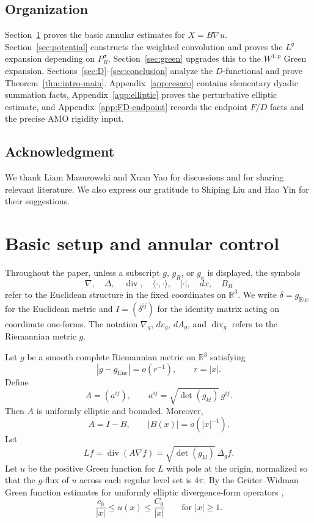 \documentclass[11pt]{amsart}
\numberwithin{equation}{section}
\theoremstyle{definition}
\newcommand{\R}{\mathbb R}
\newcommand{\Euc}{\mathrm{Euc}}
\newcommand{\divE}{\operatorname{div}}
\newcommand{\ip}[2]{\langle #1,#2\rangle}
\newcommand{\abs}[1]{\left\lvert #1\right\rvert}
\begin{document}
\subsection{Organization}
Section~\ref{sec:setup} proves the basic annular estimates for $X=B\nabla u$.  Section~\ref{sec:potential} constructs the weighted convolution and proves the $L^q$ expansion depending on $P_R^\sigma$.  Section~\ref{sec:green} upgrades this to the $W^{1,p}$ Green expansion.  Sections~\ref{sec:D}--\ref{sec:conclusion} analyze the $D$-functional and prove Theorem~\ref{thm:intro-main}.  Appendix~\ref{app:cesaro} contains elementary dyadic summation facts, Appendix~\ref{app:elliptic} proves the perturbative elliptic estimate, and Appendix~\ref{app:FD-endpoint} records the endpoint $F/D$ facts and the precise AMO rigidity input.

\subsection*{Acknowledgment} We thank Liam Mazurowski and Xuan Yao for discussions and for sharing relevant literature. We also express our gratitude to Shiping Liu and Hao Yin for their suggestions.

\section{Basic setup and annular control}
\label{sec:setup}

Throughout the paper, unless a subscript $g$, $g_R$, or $g_a$ is displayed, the symbols
$$
        \nabla,\quad \Delta,\quad \divE,\quad \ip{\cdot}{\cdot},\quad |\cdot|,
        \quad dx,\quad B_R
$$
refer to the Euclidean structure in the fixed coordinates on $\R^3$.  We write $\delta=g_{\Euc}$ for the Euclidean metric and $I=(\delta^{ij})$ for the identity matrix acting on coordinate one-forms.  The notation $\nabla_g$, $dv_g$, $dA_g$, and $\operatorname{div}_g$ refers to the Riemannian metric $g$.

Let $g$ be a smooth complete Riemannian metric on $\R^3$ satisfying
\begin{equation}\label{eq:c0-decay}
        \abs{g-g_{\Euc}}=o(r^{-1}),\qquad r=\abs{x}.
\end{equation}
Define
$$
        A=(a^{ij}),\qquad a^{ij}=\sqrt{\det(g_{kl})}\,g^{ij}.
$$
Then $A$ is uniformly elliptic and bounded.  Moreover,
\begin{equation}\label{eq:A-I-B}
        A=I-B,
        \qquad \abs{B(x)}=o(\abs{x}^{-1}).
\end{equation}
Let
$$
        Lf=\divE(A\nabla f)=\sqrt{\det(g_{kl})}\,\Delta_g f.
$$
Let $u$ be the positive Green function for $L$ with pole at the origin, normalized so that the $g$-flux of $u$ across each regular level set is $4\pi$.  By the Gr\"uter--Widman Green function estimates for uniformly elliptic divergence-form operators \cite[Theorem~1.1]{GW},
\begin{equation}\label{eq:green-two-sided}
        \frac{c_0}{\abs{x}}\le u(x)\le \frac{C_0}{\abs{x}}
        \qquad \text{for }\abs{x}\ge1.
\end{equation}
\end{document}
